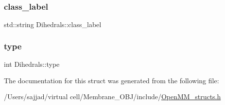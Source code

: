 \mbox{\label{structDihedrals_a43e78eca1517f607d420ddc3387adc42}} 
\subsubsection{\texorpdfstring{class\_label}{class\_label}}
{\footnotesize\ttfamily std\+::string Dihedrals\+::class\+\_\+label}

\mbox{\label{structDihedrals_aec015ae7812fd13d61a9ff90645c104b}} 
\subsubsection{\texorpdfstring{type}{type}}
{\footnotesize\ttfamily int Dihedrals\+::type}



The documentation for this struct was generated from the following file\+:\begin{DoxyCompactItemize}
\item 
/\+Users/sajjad/virtual cell/\+Membrane\+\_\+\+O\+B\+J/include/\mbox{\hyperlink{OpenMM__structs_8h}{Open\+M\+M\+\_\+structs.\+h}}\end{DoxyCompactItemize}
